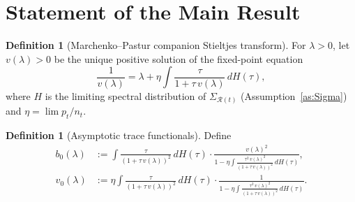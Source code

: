\documentclass[11pt]{article}
\theoremstyle{definition}
\newtheorem{definition}[theorem]{Definition}
\newcommand{\Rt}{\mathcal{R}(t)}
\newcommand{\SigR}{\Sigma_{\Rt}}
\begin{document}
\section{Statement of the Main Result}\label{sec:main}
 
\begin{definition}[Marchenko--Pastur companion Stieltjes transform]\label{def:MP}
For $\lambda>0$, let $v(\lambda)>0$ be the unique positive solution of
the fixed-point equation
\begin{equation}\label{eq:FP}
  \frac{1}{v(\lambda)}
  =\lambda+\eta\!\int\!\frac{\tau}{1+\tau\,v(\lambda)}\,dH(\tau),
\end{equation}
where $H$ is the limiting spectral distribution of $\SigR$
(Assumption~\ref{as:Sigma}) and
$\eta=\lim p_t/n_t$.
\end{definition}
 
\begin{definition}[Asymptotic trace functionals]\label{def:traces}
Define
\begin{align}
  b_0(\lambda)
  &:=\int\!\frac{\tau}{(1+\tau\,v(\lambda))^2}\,dH(\tau)
  \cdot
  \frac{v(\lambda)^2}{1-\eta\!\displaystyle\int
    \frac{\tau^2\,v(\lambda)^2}{(1+\tau\,v(\lambda))^2}\,dH(\tau)},
  \label{eq:b0}
  \\[6pt]
  v_0(\lambda)
  &:=
  \eta\!\int\!\frac{\tau}{(1+\tau\,v(\lambda))^2}\,dH(\tau)
  \cdot
  \frac{1}{1-\eta\!\displaystyle\int
    \frac{\tau^2\,v(\lambda)^2}{(1+\tau\,v(\lambda))^2}\,dH(\tau)}.
  \label{eq:v0}
\end{align}
\end{definition}
 
\end{document}
